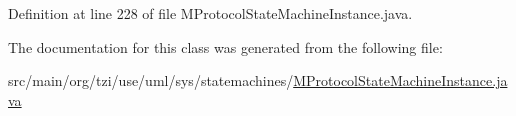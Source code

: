 Definition at line 228 of file M\-Protocol\-State\-Machine\-Instance.\-java.



The documentation for this class was generated from the following file\-:\begin{DoxyCompactItemize}
\item 
src/main/org/tzi/use/uml/sys/statemachines/\hyperlink{_m_protocol_state_machine_instance_8java}{M\-Protocol\-State\-Machine\-Instance.\-java}\end{DoxyCompactItemize}
